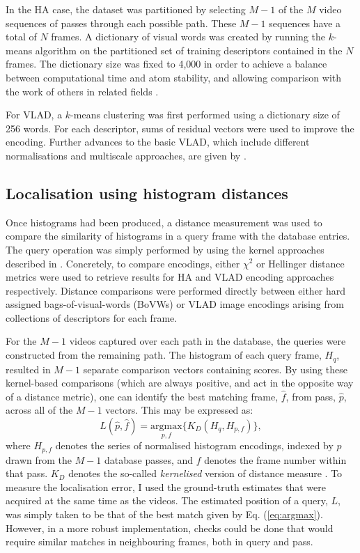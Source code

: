 In the HA case, the dataset was partitioned by selecting $M-1$ of the $M$ video sequences of passes through each possible path. These $M-1$ sequences have a total of $N$ frames. A dictionary of visual words was created by running the $k$-means algorithm on the partitioned set of training descriptors contained in the $N$ frames. The dictionary size was fixed to 4,000 in order to achieve a balance between computational time and atom stability, and allowing comparison with the work of others in related fields \cite{Chatfield2011}.

For VLAD, a $k$-means clustering was first performed using a dictionary size of 256 words. For each descriptor, sums of residual vectors were used to improve the encoding.  Further advances to the basic VLAD, which include different normalisations and multiscale approaches, are given by \cite{Arandjelovic}. 

\subsection{Localisation using histogram distances}
\label{sec:kernel_encodings}
Once histograms had been produced, a distance measurement was used to compare the similarity of histograms in a query frame with the database entries.  The query operation was simply performed by using the kernel approaches described in \cite{vedaldi2012efficient}.  Concretely, to compare encodings, either $\chi^2$ or Hellinger distance metrics \citep{vedaldi2012efficient} were used to retrieve results for HA and VLAD encoding approaches respectively. Distance comparisons were performed directly between either hard assigned bags-of-visual-words (BoVWs) or VLAD image encodings arising from collections of descriptors for each frame. 

For the $M-1$ videos captured over each path in the database, the queries were constructed from the remaining path. The histogram of each query frame, $H_q$, resulted in $M-1$ separate comparison vectors containing scores.  By using these kernel-based comparisons (which are always positive, and act in the opposite way of a distance metric), one can identify the best matching frame, $\hat{f}$, from pass, $\hat{p}$, across all of the $M-1$ vectors.  This may be expressed as: 
\begin{equation}
L(\hat{p},\hat{f}) = \underset{p,f}{\textrm{argmax}} \lbrace K_{D}(H_q,H_{p,f})\rbrace,
\label{eq:argmax}
\end{equation}
where $H_{p,f}$ denotes the series of normalised histogram encodings, indexed by $p$ drawn from the $M-1$ database passes, and $f$ denotes the frame number within that pass. $K_D$ denotes the so-called \textit{kernelised} version of distance measure \cite{vedaldi2012efficient}.  To measure the localisation error, I used the ground-truth estimates that were acquired at the same time as the videos. The estimated position of a query, $L$, was simply taken to be that of the best match given by Eq. (\ref{eq:argmax}).  However, in a more robust implementation, checks could be done that would require similar matches in neighbouring frames, both in query and pass.


